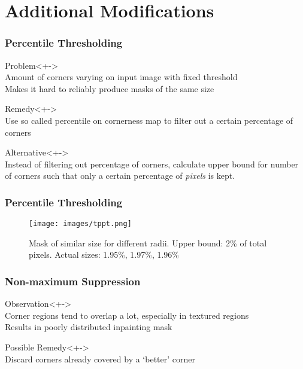 \documentclass{beamer}
\begin{document}
    \section{Additional Modifications}
    \begin{frame}[t]
        \frametitle{Percentile Thresholding}
        \begin{block}{Problem}<+->\ \\
            Amount of corners varying on input image with fixed threshold\\
            Makes it hard to reliably produce masks of the same size
        \end{block}
        \begin{block}{Remedy}<+->\ \\
            Use so called percentile on cornerness map to filter out a certain percentage of
            corners
        \end{block}
        \begin{block}{Alternative}<+->\ \\
            Instead of filtering out percentage of corners, calculate upper bound for number of
            corners such that only a certain percentage of \textit{pixels} is kept.
        \end{block}
    \end{frame}

    \begin{frame}[t]
        \frametitle{Percentile Thresholding}
        \begin{figure}[htpb]
            \centering
            \texttt{[image: images/tppt.png]}
            \caption{Mask of similar size for different radii. Upper bound: 2\% of total pixels.
            Actual sizes: 1.95\%, 1.97\%, 1.96\%}
        \end{figure}
    \end{frame}

     \begin{frame}[t]
        \frametitle{Non-maximum Suppression}
        \begin{block}{Observation}<+->\ \\
            Corner regions tend to overlap a lot, especially in textured regions\\
            Results in poorly distributed inpainting mask
        \end{block}
        \begin{block}{Possible Remedy}<+->\ \\
            Discard corners already covered by a `better' corner
        \end{block}
     \end{frame}
\end{document}
